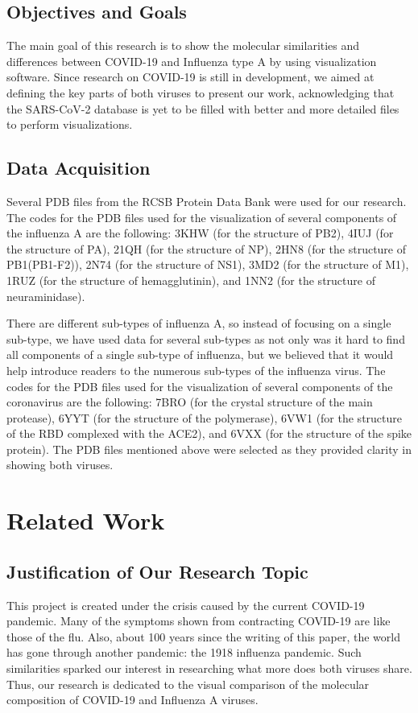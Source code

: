 \documentclass[conference]{IEEEtran}
\begin{document}
\subsection{Objectives and Goals}
The main goal of this research is to show the molecular similarities and differences between COVID-19 and Influenza type A by using visualization software. Since research on COVID-19 is still in development, we aimed at defining the key parts of both viruses to present our work, acknowledging that the SARS-CoV-2 database is yet to be filled with better and more detailed files to perform visualizations.  

\subsection{Data Acquisition}

Several PDB files from the RCSB Protein Data Bank were used for our research. The codes for the PDB files used for the visualization of several components of the influenza A are the following: 3KHW (for the structure of PB2), 4IUJ (for the structure of PA), 21QH (for the structure of NP), 2HN8 (for the structure of PB1(PB1-F2)), 2N74 (for the structure of NS1), 3MD2 (for the structure of M1), 1RUZ (for the structure of hemagglutinin), and 1NN2 (for the structure of neuraminidase). 

There are different sub-types of influenza A, so instead of focusing on a single sub-type, we have used data for several sub-types as not only was it hard to find all components of a single sub-type of influenza, but we believed that it would help introduce readers to the numerous sub-types of the influenza virus. The codes for the PDB files used for the visualization of several components of the coronavirus are the following: 7BRO (for the crystal structure of the main protease), 6YYT (for the structure of the polymerase), 6VW1 (for the structure of the RBD complexed with the ACE2), and 6VXX (for the structure of the spike protein). The PDB files mentioned above were selected as they provided clarity in showing both viruses. 

\section{Related Work}
\subsection{Justification of Our Research Topic}
This project is created under the crisis caused by the current COVID-19 pandemic. Many of the symptoms shown from contracting COVID-19 are like those of the flu. Also, about 100 years since the writing of this paper, the world has gone through another pandemic: the 1918 influenza pandemic. Such similarities sparked our interest in researching what more does both viruses share. Thus, our research is dedicated to the visual comparison of the molecular composition of COVID-19 and Influenza A viruses.
\end{document}
